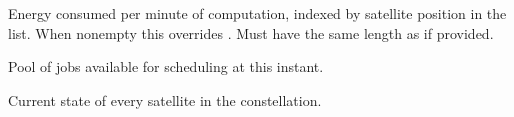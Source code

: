 \documentclass[letterpaper,10pt,english]{sphinxmanual}
\begin{document}
\begin{fulllineitems}
\begin{fulllineitems}
\label{\detokenize{api:scheduler.SimulationSnapshot.energyPerMinute}}
\pysigstartsignatures
\pysigline
{}
\pysigstopsignatures
\sphinxAtStartPar
Energy consumed per minute of computation, indexed by satellite position in
the  list.  When non\sphinxhyphen{}empty this overrides .
Must have the same length as  if provided.

\end{fulllineitems}


\begin{fulllineitems}
\label{\detokenize{api:scheduler.SimulationSnapshot.jobs}}
\pysigstartsignatures
\pysigline
{}
\pysigstopsignatures
\sphinxAtStartPar
Pool of jobs available for scheduling at this instant.

\end{fulllineitems}


\begin{fulllineitems}
\label{\detokenize{api:scheduler.SimulationSnapshot.satellites}}
\pysigstartsignatures
\pysigline
{}
\pysigstopsignatures
\sphinxAtStartPar
Current state of every satellite in the constellation.

\end{fulllineitems}


\end{fulllineitems}

\end{document}
